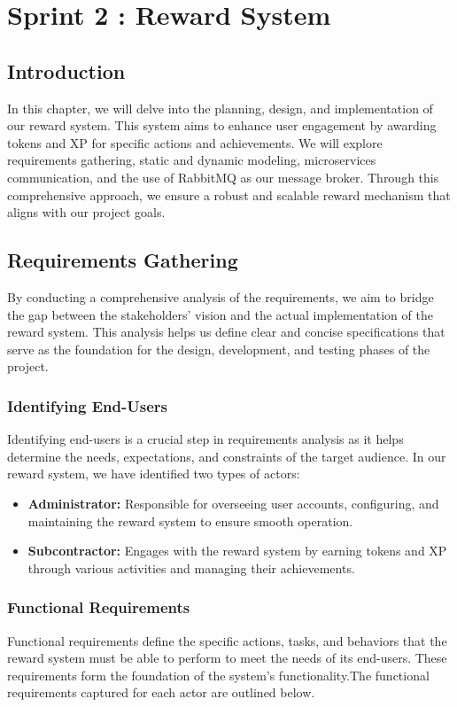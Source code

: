\chapter{ Sprint 2 : Reward System}

\setcounter{secnumdepth}{0}
\section{Introduction}
In this chapter, we will delve into the planning, design, and implementation of our reward system. This system aims to enhance user engagement by awarding tokens and XP for specific actions and achievements. We will explore requirements gathering, static and dynamic modeling, microservices communication, and the use of RabbitMQ as our message broker. Through this comprehensive approach, we ensure a robust and scalable reward mechanism that aligns with our project goals.\setcounter{secnumdepth}{3} 
\section{Requirements Gathering}
By conducting a comprehensive analysis of the requirements, we aim to bridge the gap between the stakeholders’ vision and the actual implementation of the reward system. This analysis helps us define clear and concise specifications that serve as the foundation for the design, development, and testing phases of the project.

\subsection{Identifying End-Users}
Identifying end-users is a crucial step in requirements analysis as it helps determine the needs, expectations, and constraints of the target audience. In our reward system, we have identified two types of actors:

\begin{itemize}
    \item \textbf{Administrator:} Responsible for overseeing user accounts, configuring, and maintaining the reward system to ensure smooth operation.
    \item \textbf{Subcontractor:} Engages with the reward system by earning tokens and XP through various activities and managing their achievements.
\end{itemize}

\subsection{Functional Requirements}
Functional requirements define the specific actions, tasks, and behaviors that the reward system must be able to perform to meet the needs of its end-users. These requirements form the foundation of the system’s functionality.The functional requirements captured for each actor are outlined below.

